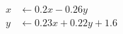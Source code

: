\documentclass[preview]{standalone}
\begin{document}
\begin{align*}
x &\leftarrow 0.2 x - 0.26 y \\ y &\leftarrow 0.23 x + 0.22 y + 1.6
\end{align*}
\end{document}
